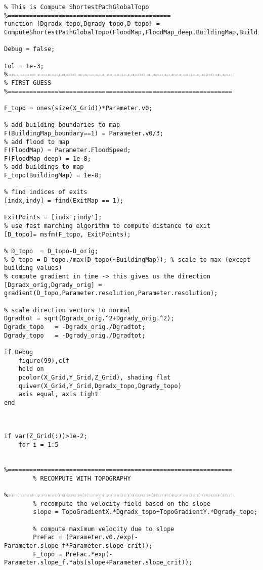 \lstset{basicstyle=\footnotesize\ttfamily}
    
\begin{lstlisting}[breaklines]
%=============================================
% This is Compute ShortestPathGlobalTopo
%=============================================
function [Dgradx_topo,Dgrady_topo,D_topo] = ComputeShortestPathGlobalTopo(FloodMap,FloodMap_deep,BuildingMap,BuildingMap_boundary,ExitMap,X_Grid,Y_Grid,Z_Grid,D_orig,TopoGradientX,TopoGradientY,Parameter)

Debug = false;

tol = 1e-3;
%==============================================================
% FIRST GUESS
%==============================================================

F_topo = ones(size(X_Grid))*Parameter.v0;

% add building boundaries to map
F(BuildingMap_boundary==1) = Parameter.v0/3;
% add flood to map
F(FloodMap) = Parameter.FloodSpeed;
F(FloodMap_deep) = 1e-8;
% add buildings to map
F_topo(BuildingMap) = 1e-8;

% find indices of exits
[indx,indy] = find(ExitMap == 1);

ExitPoints = [indx';indy'];
% use fast marching algorithm to compute distance to exit
[D_topo]= msfm(F_topo, ExitPoints);

% D_topo  = D_topo-D_orig;
% D_topo = D_topo./max(D_topo(~BuildingMap)); % scale to max (except building values)
% compute gradient in time -> this gives us the direction
[Dgradx_orig,Dgrady_orig] = gradient(D_topo,Parameter.resolution,Parameter.resolution);

% scale direction vectors to normal
Dgradtot = sqrt(Dgradx_orig.^2+Dgrady_orig.^2);
Dgradx_topo   = -Dgradx_orig./Dgradtot;
Dgrady_topo   = -Dgrady_orig./Dgradtot;

if Debug
    figure(99),clf
    hold on
    pcolor(X_Grid,Y_Grid,Z_Grid), shading flat
    quiver(X_Grid,Y_Grid,Dgradx_topo,Dgrady_topo)
    axis equal, axis tight
end



if var(Z_Grid(:))>1e-2;
    for i = 1:5

        %==============================================================
        % RECOMPUTE WITH TOPOGRAPHY
        %==============================================================
        % recompute the velocity field based on the slope
        slope = TopoGradientX.*Dgradx_topo+TopoGradientY.*Dgrady_topo;

        % compute maximum velocity due to slope
        PreFac = (Parameter.v0./exp(-Parameter.slope_f*Parameter.slope_crit));
        F_topo = PreFac.*exp(-Parameter.slope_f.*abs(slope+Parameter.slope_crit));


\end{lstlisting}
